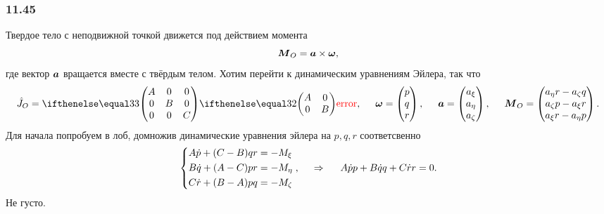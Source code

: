 \subsubsection*{11.45}
Твердое тело с неподвижной точкой движется под действием момента 
\begin{equation*}
    \mbox{\boldmath $M$}_O = \mbox{\boldmath $a$} \times \mbox{\boldmath $\omega$},
\end{equation*}
где вектор $\mbox{\boldmath $a$}$ вращается вместе с твёрдым телом.
Хотим перейти к динамическим уравнениям Эйлера, так что
\begin{equation*}
    \hat{J}_O = \dmat{3}{A}{B}{C}, \hspace{0.5cm} 
    \vc{\omega} = \begin{pmatrix}
        p \\ q \\ r
    \end{pmatrix},
    \hspace{0.5cm} 
    \vc{a} = \begin{pmatrix}
        a_\xi \\ a_\eta \\ a_\zeta
    \end{pmatrix}, 
    \hspace{0.5cm} 
    \vc{M}_O = \begin{pmatrix}
        a_\eta r - a_\zeta q \\
        a_\zeta p - a_\xi r \\
        a_\xi r - a_\eta p
    \end{pmatrix}.
\end{equation*}
Для начала попробуем в лоб, домножив динамические уравнения эйлера на $p, q, r$ соответсвенно
\begin{equation*}
    \left\{\begin{aligned}
        A \dot{p} + (C-B) q r &= - M_{\xi} \\
        B \dot{q} + (A-C) p r &= - M_{\eta} \\
        C \dot{r} + (B-A) p q &= - M_{\zeta} \\
    \end{aligned}\right.,
    \hspace{0.5cm} \Rightarrow \hspace{0.5cm}
    A \dot{p} p + B \dot{q} q + C \dot{r} r = 0.
\end{equation*}
Не густо. 

